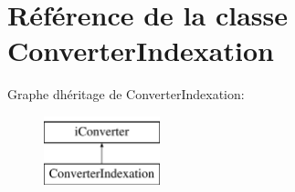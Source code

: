 \hypertarget{classConverterIndexation}{}\section{Référence de la classe Converter\+Indexation}
\label{classConverterIndexation}
Graphe d\textquotesingle{}héritage de Converter\+Indexation\+:\begin{figure}[H]
\begin{center}
\leavevmode
\includegraphics[height=2.000000cm]{classConverterIndexation}
\end{center}
\end{figure}
